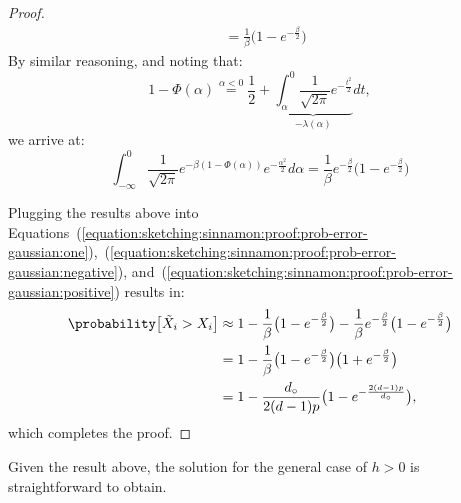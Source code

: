 \begin{proof}
\begin{align*}
        &= \frac{1}{\beta} \big( 1 - e^{-\frac{\beta}{2}} \big)
    \end{align*}
    By similar reasoning, and noting that:
    \begin{equation*}
        1 - \Phi(\alpha) \overset{\alpha < 0}{=} \frac{1}{2} + \underbrace{\int_{\alpha}^{0} \frac{1}{\sqrt{2\pi}} e^{-\frac{t^2}{2}}}_{-\lambda(\alpha)} dt,
    \end{equation*}
    we arrive at:
    \begin{equation*}
        \int_{-\infty}^{0} \frac{1}{\sqrt{2\pi}} e^{-\beta (1 - \Phi(\alpha))} e^{-\frac{\alpha^2}{2}} d\alpha = \frac{1}{\beta} e^{-\frac{\beta}{2}} \big( 1 - e^{-\frac{\beta}{2}} \big)
    \end{equation*}

    Plugging the results above into Equations~(\ref{equation:sketching:sinnamon:proof:prob-error-gaussian:one}),~(\ref{equation:sketching:sinnamon:proof:prob-error-gaussian:negative}), and~(\ref{equation:sketching:sinnamon:proof:prob-error-gaussian:positive}) results in:
    \begin{align*}
        \probability\big[ \tilde{X}_i > X_i \big] &\approx 1 - \frac{1}{\beta} \big( 1 - e^{-\frac{\beta}{2}} \big) - \frac{1}{\beta} e^{-\frac{\beta}{2}} \big( 1 - e^{-\frac{\beta}{2}} \big) \\
        &= 1 - \frac{1}{\beta} \big( 1 - e^{-\frac{\beta}{2}} \big) \big( 1 + e^{-\frac{\beta}{2}} \big) \\
        &= 1 - \frac{d_\circ}{2(d-1)p} \big( 1 - e^{-\frac{2(d - 1)p}{d_\circ}} \big),
    \end{align*}
    which completes the proof.
\end{proof}

Given the result above, the solution for the general case of $h > 0$ is straightforward to obtain.

